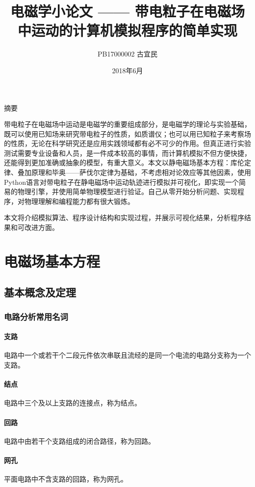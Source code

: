 \documentclass[UTF-8,cs4size]{ctexart}
\title{电磁学小论文 —— 带电粒子在电磁场中运动的计算机模拟程序的简单实现}
\author{PB17000002  古宜民}
\date{2018年6月}
\begin{document}
 \normalsize
\maketitle
\begin{center}
	摘要
\end{center}

带电粒子在电磁场中运动是电磁学的重要组成部分，是电磁学的理论与实验基础，既可以使用已知场来研究带电粒子的性质，如质谱仪；也可以用已知粒子来考察场的性质，无论在科学研究还是应用实践领域都有必不可少的作用。但真正进行实验测试需要专业设备和人员，是一件成本较高的事情，而计算机模拟不但方便快捷，还能得到更加准确或抽象的模型，有重大意义。本文以静电磁场基本方程：库伦定律、叠加原理和毕奥——萨伐尔定律为基础，不考虑相对论效应等其他因素，使用Python语言对带电粒子在静电磁场中运动轨迹进行模拟并可视化，即实现一个简易的物理引擎，并使用简单物理模型进行验证。自己从零开始分析问题、实现程序，对物理理解和编程能力都有很大锻炼。

本文将介绍模拟算法、程序设计结构和实现过程，并展示可视化结果，分析程序结果和可改进方面。
\clearpage
\section{电磁场基本方程}
\subsection{基本概念及定理}
\subsubsection{电路分析常用名词}
\paragraph{支路} 电路中一个或若干个二段元件依次串联且流经的是同一个电流的电路分支称为一个支路。
\paragraph{结点} 电路中三个及以上支路的连接点，称为结点。
\paragraph{回路} 电路中由若干个支路组成的闭合路径，称为回路。
\paragraph{网孔} 平面电路中不含支路的回路，称为网孔。
\end{document}
